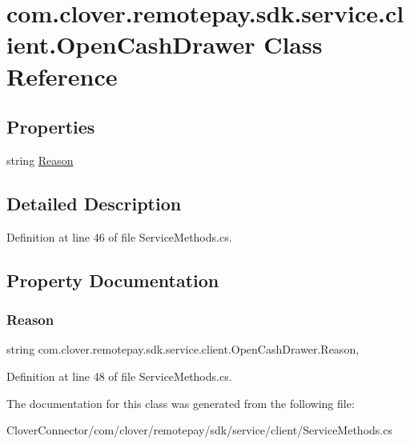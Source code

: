 \hypertarget{classcom_1_1clover_1_1remotepay_1_1sdk_1_1service_1_1client_1_1_open_cash_drawer}{}\section{com.\+clover.\+remotepay.\+sdk.\+service.\+client.\+Open\+Cash\+Drawer Class Reference}
\label{classcom_1_1clover_1_1remotepay_1_1sdk_1_1service_1_1client_1_1_open_cash_drawer}
\subsection*{Properties}
\begin{DoxyCompactItemize}
\item 
string \hyperlink{classcom_1_1clover_1_1remotepay_1_1sdk_1_1service_1_1client_1_1_open_cash_drawer_a86ce2f2176d0339fca367040f95da0f3}{Reason}
\end{DoxyCompactItemize}


\subsection{Detailed Description}


Definition at line 46 of file Service\+Methods.\+cs.



\subsection{Property Documentation}
\mbox{\label{classcom_1_1clover_1_1remotepay_1_1sdk_1_1service_1_1client_1_1_open_cash_drawer_a86ce2f2176d0339fca367040f95da0f3}} 
\subsubsection{\texorpdfstring{Reason}{Reason}}
{\footnotesize\ttfamily string com.\+clover.\+remotepay.\+sdk.\+service.\+client.\+Open\+Cash\+Drawer.\+Reason\hspace{0.3cm}{\ttfamily [get]}, {\ttfamily [set]}}



Definition at line 48 of file Service\+Methods.\+cs.



The documentation for this class was generated from the following file\+:\begin{DoxyCompactItemize}
\item 
Clover\+Connector/com/clover/remotepay/sdk/service/client/Service\+Methods.\+cs\end{DoxyCompactItemize}

